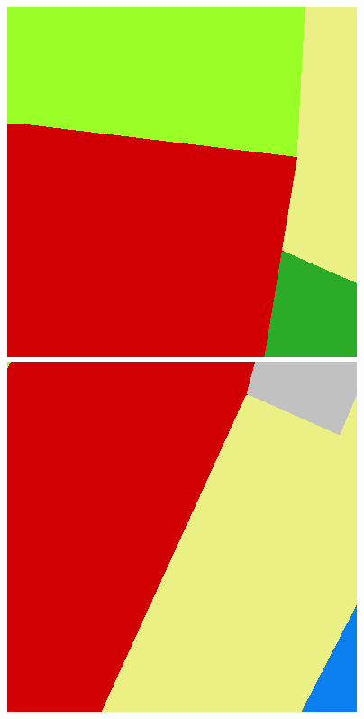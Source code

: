 \begin{figure}[h]
    \vspace{3mm}

    \includegraphics[width=\LabelConsiderationImageWidth]{images/consideration_labels/44883-label}
    \hspace{1mm}
    \includegraphics[width=\LabelConsiderationImageWidth]{images/consideration_labels/150815-label}
    \hspace{1mm}

\end{figure}
